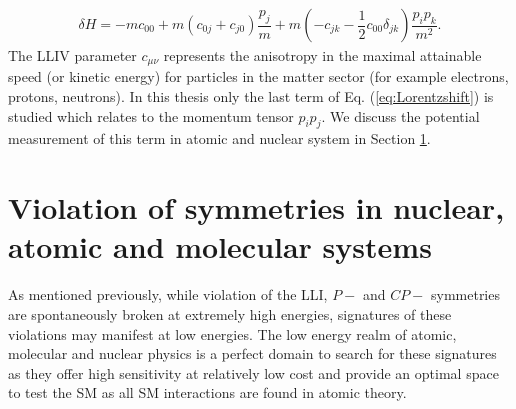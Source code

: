 \documentclass[10pt,a4paper, twoside, openright]{report}
\begin{document}
\begin{align} \label{eq:Lorentzshift}
\delta H = -mc_{00} + m\left(c_{0j} + c_{j0}\right)\dfrac{p_j}{m} + m\left(-c_{jk} - \dfrac{1}{2}c_{00}\delta_{jk}\right)\dfrac{p_ip_k}{m^2}.
\end{align} 
The LLIV parameter $c_{\mu\nu}$ represents the anisotropy in the maximal attainable speed (or kinetic energy) for particles in the matter sector (for example electrons, protons, neutrons). In this thesis only the last term of  Eq. (\ref{eq:Lorentzshift}) is studied  which relates to the momentum tensor $p_ip_j$. We discuss the potential measurement of this term in atomic and nuclear system in Section \ref{sec:ViolationInAtoms}. 
\section{Violation of symmetries in nuclear, atomic and molecular systems} \label{sec:ViolationInAtoms}
As mentioned previously, while violation of the LLI, $P-$ and $CP-$ symmetries are spontaneously broken at extremely high energies, signatures of these violations may manifest at low energies. The low energy realm of atomic, molecular and nuclear physics is a perfect domain to search for these signatures as they offer high sensitivity at relatively low cost and provide an optimal space to test the SM as all SM interactions are found in atomic theory. 
\end{document}
